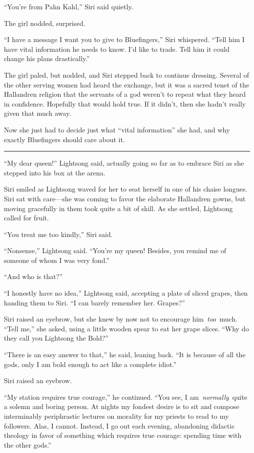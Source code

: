 “You’re from Pahn Kahl,” Siri said quietly.

The girl nodded, surprised.

“I have a message I want you to give to Bluefingers,” Siri whispered. “Tell him I have vital information he needs to know. I’d like to trade. Tell him it could change his plans drastically.”

The girl paled, but nodded, and Siri stepped back to continue dressing. Several of the other serving women had heard the exchange, but it was a sacred tenet of the Hallandren religion that the servants of a god weren’t to repeat what they heard in confidence. Hopefully that would hold true. If it didn’t, then she hadn’t really given that much away.

Now she just had to decide just what “vital information” she had, and why exactly Bluefingers should care about it.

\bigskip \hrule \bigskip

“My dear queen!” Lightsong said, actually going so far as to embrace Siri as she stepped into his box at the arena.

Siri smiled as Lightsong waved for her to seat herself in one of his chaise longues. Siri sat with care—she was coming to favor the elaborate Hallandren gowns, but moving gracefully in them took quite a bit of skill. As she settled, Lightsong called for fruit.

“You treat me too kindly,” Siri said.

“Nonsense,” Lightsong said. “You’re my queen! Besides, you remind me of someone of whom I was very fond.”

“And who is that?”

“I honestly have no idea,” Lightsong said, accepting a plate of sliced grapes, then handing them to Siri. “I can barely remember her. Grapes?”

Siri raised an eyebrow, but she knew by now not to encourage him~\textit{too}~much. “Tell me,” she asked, using a little wooden spear to eat her grape slices. “Why do they call you Lightsong the Bold?”

“There is an easy answer to that,” he said, leaning back. “It is because of all the gods, only I am bold enough to act like a complete idiot.”

Siri raised an eyebrow.

“My station requires true courage,” he continued. “You see, I am~\textit{normally}~quite a solemn and boring person. At nights my fondest desire is to sit and compose interminably periphrastic lectures on morality for my priests to read to my followers. Alas, I cannot. Instead, I go out each evening, abandoning didactic theology in favor of something which requires true courage: spending time with the other gods.”

